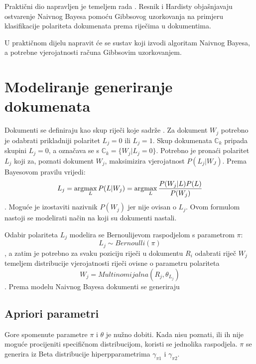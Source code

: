Praktični dio napravljen je temeljem rada \citep{resnik2010gibbs}. Resnik i Hardisty objašnjavaju ostvarenje Naivnog Bayesa  pomoću Gibbsovog uzorkovanja na primjeru klasifikacije polariteta dokumenata prema riječima u dokumentima. 

U praktičnom dijelu napravit će se sustav koji izvodi algoritam Naivnog Bayesa, a potrebne vjerojatnosti računa Gibbsovim uzorkovanjem. 

\section{Modeliranje generiranje dokumenata}

Dokumenti se definiraju kao skup riječi koje sadrže . Za dokument $W_j$ potrebno je odabrati prikladniji polaritet $L_j = 0$ ili $L_j = 1$. Skup dokumenata $\mathbb{C}_{k}$ pripada skupini $L_j = 0$, a označava se s $\mathbb{C}_{k} = \{W_j | L_j = 0\}$. Potrebno je pronaći polaritet $L_j$ koji za, poznati dokument $W_j$, maksimizira vjerojatnost $P(L_j|W_J)$. Prema Bayesovom pravilu vrijedi:
\begin{equation}
L_j = \arg\!\max_L P(L|W_j) = \arg\!\max_L \frac{P(W_j|L)P(L)}{P(W_j)}
\end{equation}.
Moguće je izostaviti nazivnik $P(W_j)$ jer nije ovisan o $L_j$. Ovom formulom nastoji se modelirati način na koji su dokumenti nastali.

Odabir polariteta $L_j$ modelira se Bernoulijevom raspodjelom s parametrom $\pi$:
\begin{equation}
L_j \sim Bernoulli(\pi)
\end{equation}, a zatim je potrebno za svaku poziciju riječi u dokumentu $R_i$ odabrati riječ $W_j$ temeljem distribucije vjerojatnosti riječi ovisne o parametru polariteta %
\begin{equation}
W_j = Multinomijalna(R_j, \theta_{L_{j}})
\end{equation}. Prema modelu Naivnog Bayesa dokumenti se generiraju %

\subsection{Apriori parametri}
Gore spomenute parametre $\pi$ i $\theta$ je nužno dobiti. Kada nisu poznati, ili ih nije moguće procijeniti specifičnom distribucijom, koristi se jednolika raspodjela. $\pi$ se generira iz Beta distribucije hiperpparametrima $\gamma_{\pi 1}$ i $\gamma_{\pi 2}$. 